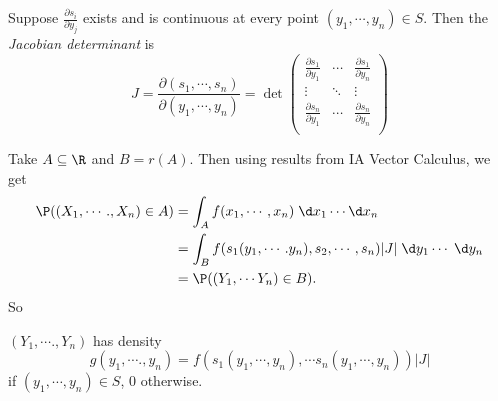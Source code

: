 \documentclass[a4paper]{article}
\begin{document}
\begin{defi}
  Suppose $\frac{\partial s_i}{\partial y_j}$ exists and is continuous at every point $(y_1, \cdots, y_n)\in S$. Then the \emph{Jacobian determinant} is
  \[
    J = \frac{\partial (s_1, \cdots, s_n)}{\partial (y_1, \cdots, y_n)} =
    \det
    \begin{pmatrix}
      \frac{\partial s_1}{\partial y_1} & \cdots & \frac{\partial s_1}{\partial y_n}\\
      \vdots & \ddots & \vdots\\
      \frac{\partial s_n}{\partial y_1} & \cdots & \frac{\partial s_n}{\partial y_n}\\
    \end{pmatrix}
  \]
\end{defi}
Take $A\subseteq \R$ and $B = r(A)$. Then using results from IA Vector Calculus, we get
\begin{align*}
  \P((X_1, \cdots., X_n)\in A) &= \int_A f(x_1, \cdots, x_n) \;\d x_1\cdots \d x_n\\
  &= \int_B f(s_1(y_1, \cdots. y_n), s_2, \cdots, s_n) |J|\;\d y_1\cdots \;\d y_n\\
  &= \P((Y_1, \cdots Y_n)\in B).
\end{align*}
So
\begin{prop}
  $(Y_1, \cdots., Y_n)$ has density
  \[
    g(y_1, \cdots., y_n) = f(s_1(y_1, \cdots, y_n), \cdots s_n(y_1, \cdots, y_n))|J|
  \]
  if $(y_1,  \cdots, y_n)\in S$, $0$ otherwise.
\end{prop}
\end{document}
